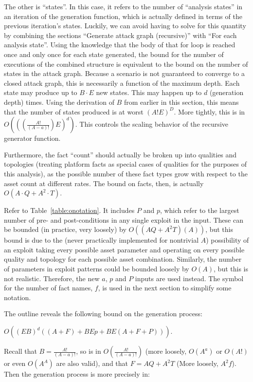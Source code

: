 The other is ``states''. In this case, it refers to the number of ``analysis states''
in an iteration of the generation function, which is actually defined in terms
of the previous iteration's states. Luckily, we can avoid having to solve for
this quantity by combining the sections ``Generate attack graph (recursive)''
with ``For each analysis state''. Using the knowledge that the body of that for
loop is reached once and only once for each state generated, the bound for the
number of executions of the combined structure is equivalent to the bound on
the number of states in the attack graph. Because a scenario is not guaranteed
to converge to a closed attack graph, this is necessarily a function of the
maximum depth. Each state may produce up to $B \cdot
E$ new states. This may happen up to $d$ (generation depth) times. Using the
derivation of $B$ from earlier in this section, this means 
that the number of states produced is at worst $(A!E)^{D}$.
More tightly, this is in 
$O\left(\left(\left(\frac{A!}{(A-a)!}\right)E\right)^{d}\right)$.
This controls the scaling behavior of the recursive generator function.

Furthermore, the fact ``count'' should actually be broken up into qualities and
topologies (treating platform facts as special cases of qualities for the
purposes of this analysis), as the possible number of these fact types grow 
with respect to the asset count at different rates. The bound on facts, then,
is actually $O(A \cdot Q + A^2 \cdot T)$.

Refer to Table~\ref{table:onotation}. It
includes $P$ and $p$, which refer to the largest number of pre- and 
post-conditions in any single exploit in the input. These can be bounded (in
practice, very loosely) by $O((AQ + A^2T)(A))$, but this bound is due to the
(never practically implemented for nontrivial $A$) possibility of an exploit
taking every possible asset parameter and operating on every possible quality
and topology for each possible asset combination. Similarly, the number of
parameters in exploit patterns could be bounded loosely by $O(A)$, but this is
not realistic. Therefore, the new $a$, $p$ and $P$ inputs are used instead.
The symbol for the number of fact names, $f$, is used in the next
section to simplify some notation.



The outline
reveals the following bound on the generation process:

$O((EB)^d((A+F) + BEp + BE(A+F+P)))$.

Recall that $B = \frac{A!}{(A-a)!}$, so is in $O(\frac{A!}{(A-a)!})$ 
(more loosely, $O(A^a)$ or $O(A!)$ or
even $O(A^A)$ are also valid), and that $F = AQ + A^2T$ (More loosely, $A^2f$). 
Then the generation process is more precisely in:

